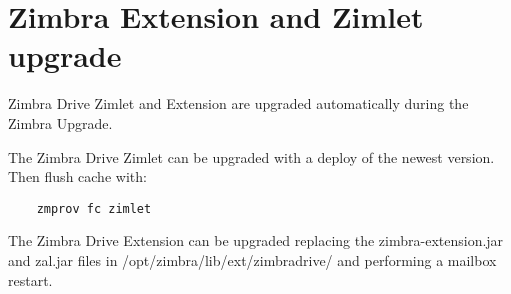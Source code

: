 \section{Zimbra Extension and Zimlet upgrade}
\begin{warning}
    Zimbra Drive Zimlet and Extension are upgraded automatically during the Zimbra Upgrade.
\end{warning}

The Zimbra Drive Zimlet can be upgraded with a deploy of the newest version.\\
Then flush cache with:
\begin{verbatim}
    zmprov fc zimlet
\end{verbatim}

The Zimbra Drive Extension can be upgraded replacing the zimbra-extension.jar and zal.jar files in /opt/zimbra/lib/ext/zimbradrive/ and performing a mailbox restart.